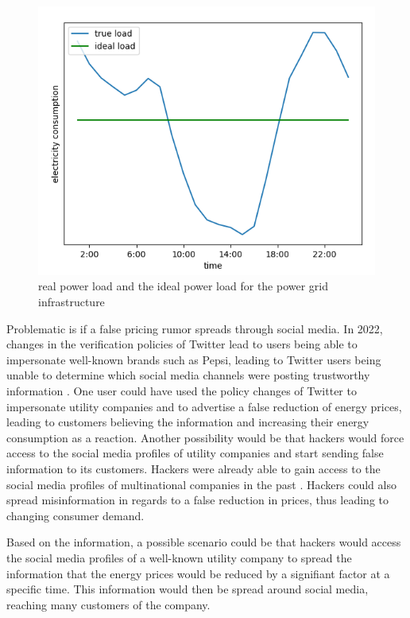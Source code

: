 \begin{figure}[!ht]
    \center
    \includegraphics[scale=.75]{figs/duckcurve.png}
    \caption{real power load and the ideal power load for the 
    power grid infrastructure}
    \label{duckcurve}
\end{figure}

Problematic is if a false pricing rumor spreads through social media.
In 2022, changes in the verification policies of Twitter lead to users being able 
to impersonate well-known brands such as Pepsi, leading to Twitter 
users being unable to determine which social media channels were
posting trustworthy information \cite{twitterchaos}. One user could
have used the policy changes of Twitter to impersonate 	utility companies
and to advertise a false reduction of energy prices, leading to customers
believing the information and increasing their energy consumption as a 
reaction. Another possibility would be that hackers would force access to the
social media profiles of 	utility companies and start sending false 
information to its customers. Hackers were already able to gain access
to the social media profiles of multinational companies in the past
\cite{twitterhacker}. Hackers could also spread misinformation in regards
to a false reduction in prices, thus leading to changing consumer demand.


Based on the information, a possible scenario could be that hackers would
access the social media profiles of a well-known utility company
to spread the information that the energy prices would be reduced by 
a signifiant factor at a specific time. This information would then be 
spread around social media, reaching many customers of the company.


